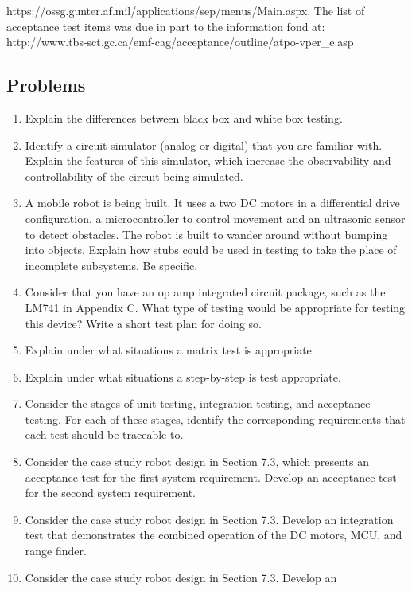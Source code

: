 https://ossg.gunter.af.mil/applications/sep/menus/Main.aspx. The list of
acceptance test items was due in part to the information fond at:
http://www.tbs-sct.gc.ca/emf-cag/acceptance/outline/atpo-vper\_e.asp

\subsection{Problems}\label{problems}

\begin{enumerate}
\def\labelenumi{\arabic{enumi}.}
\item
  Explain the differences between black box and white box testing.
\item
  Identify a circuit simulator (analog or digital) that you are familiar
  with. Explain the features of this simulator, which increase the
  observability and controllability of the circuit being simulated.
\item
  A mobile robot is being built. It uses a two DC motors in a
  differential drive configuration, a microcontroller to control
  movement and an ultrasonic sensor to detect obstacles. The robot is
  built to wander around without bumping into objects. Explain how stubs
  could be used in testing to take the place of incomplete subsystems.
  Be specific.
\item
  Consider that you have an op amp integrated circuit package, such as
  the LM741 in Appendix C. What type of testing would be appropriate for
  testing this device? Write a short test plan for doing so.
\item
  Explain under what situations a matrix test is appropriate.
\item
  Explain under what situations a step-by-step is test appropriate.
\item
  Consider the stages of unit testing, integration testing, and
  acceptance testing. For each of these stages, identify the
  corresponding requirements that each test should be traceable to.
\item
  Consider the case study robot design in Section 7.3, which presents an
  acceptance test for the first system requirement. Develop an
  acceptance test for the second system requirement.
\item
  Consider the case study robot design in Section 7.3. Develop an
  integration test that demonstrates the combined operation of the DC
  motors, MCU, and range finder.
\item
  Consider the case study robot design in Section 7.3. Develop an

\end{enumerate}
